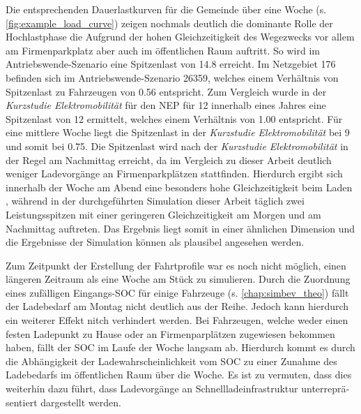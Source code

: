Die entsprechenden Dauerlastkurven für die Gemeinde über eine Woche (s. \autoref{fig:example_load_curve}) zeigen nochmals deutlich die dominante Rolle der Hochlastphase die Aufgrund der hohen Gleichzeitigkeit des Wegezwecks \Arbeit vor allem am Firmenparkplatz aber auch im öffentlichen Raum auftritt.
So wird im Antriebswende-Szenario eine Spitzenlast von \SI{14.8}{\mw} erreicht.
Im Netzgebiet \num{176} befinden sich im Antriebswende-Szenario \SI{26359}{\FZ}, welches einem Verhältnis von Spitzenlast zu Fahrzeugen von \SI{0.56}{\kWperFZ} entspricht.
Zum Vergleich wurde in der \textit{Kurzstudie Elektromobilität} für den \gls{NEP} \cite{Ebner2019} für \SI{12}{\MioStk} innerhalb eines Jahres eine Spitzenlast von \SI{12}{\gw} ermittelt, welches einem Verhältnis von \SI{1.00}{\kWperFZ} entspricht.
Für eine mittlere Woche liegt die Spitzenlast in der \textit{Kurzstudie Elektromobilität} bei \SI{9}{\gw} und somit bei \SI{0.75}{\kWperFZ}.
Die Spitzenlast wird nach der \textit{Kurzstudie Elektromobilität} in der Regel am Nachmittag erreicht, da im Vergleich zu dieser Arbeit deutlich weniger Ladevorgänge an Firmenparkplätzen stattfinden.
Hierdurch ergibt sich innerhalb der Woche am Abend eine besonders hohe Gleichzeitigkeit beim Laden \zHdot, während in der durchgeführten Simulation dieser Arbeit täglich zwei Leistungsspitzen mit einer geringeren Gleichzeitigkeit am Morgen und am Nachmittag auftreten.
Das Ergebnis liegt somit in einer ähnlichen Dimension und die Ergebnisse der Simulation können als plausibel angesehen werden.





Zum Zeitpunkt der Erstellung der Fahrtprofile war es noch nicht möglich, einen längeren Zeitraum als eine Woche am Stück zu simulieren.
Durch die Zuordnung eines zufälligen Eingangs-\gls{SOC} für einige Fahrzeuge (s. \autoref{chap:simbev_theo}) fällt der Ladebedarf am Montag nicht deutlich aus der Reihe.
Jedoch kann hierdurch ein weiterer Effekt nitch verhindert werden.
Bei Fahrzeugen, welche weder einen festen Ladepunkt zu Hause oder an Firmenparplätzen zugewiesen bekommen haben, fällt der \gls{SOC} im Laufe der Woche langsam ab.
Hierdurch kommt es durch die Abhängigkeit der Ladewahrscheinlichkeit vom \gls{SOC} zu einer Zunahme des Ladebedarfs im öffentlichen Raum über die Woche.
Es ist zu vermuten, dass dies weiterhin dazu führt, dass Ladevorgänge an Schnellladeinfrastruktur un­ter­re­prä­sen­tiert dargestellt werden.


